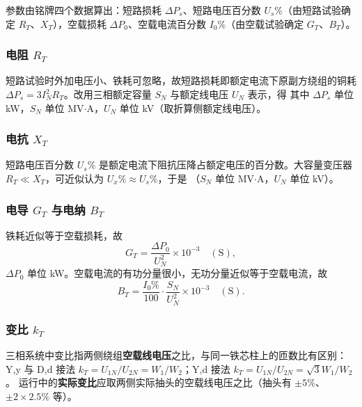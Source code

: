 参数由铭牌四个数据算出：短路损耗 $\Delta P_s$、短路电压百分数 $U_s\%$（由短路试验确定
$R_T$、$X_T$），空载损耗 $\Delta P_0$、空载电流百分数 $I_0\%$（由空载试验确定 $G_T$、$B_T$）。

\subsubsection{电阻 $R_T$}

短路试验时外加电压小、铁耗可忽略，故短路损耗即额定电流下原副方绕组的铜耗
$\Delta P_s=3I_N^2R_T$。改用三相额定容量 $S_N$ 与额定线电压 $U_N$ 表示，得
其中 $\Delta P_s$ 单位 kW，$S_N$ 单位 MV$\cdot$A，$U_N$ 单位 kV（取折算侧额定线电压）。

\subsubsection{电抗 $X_T$}

短路电压百分数 $U_s\%$ 是额定电流下阻抗压降占额定电压的百分数。大容量变压器
$R_T\ll X_T$，可近似认为 $U_x\%\approx U_s\%$，于是
（$S_N$ 单位 MV$\cdot$A，$U_N$ 单位 kV）。

\subsubsection{电导 $G_T$ 与电纳 $B_T$}

铁耗近似等于空载损耗，故
\begin{equation}
  G_T=\frac{\Delta P_0}{U_N^{2}}\times10^{-3}\quad(\text{S}),
\end{equation}
$\Delta P_0$ 单位 kW。空载电流的有功分量很小，无功分量近似等于空载电流，故
\begin{equation}
  B_T=\frac{I_0\%}{100}\cdot\frac{S_N}{U_N^{2}}\times10^{-3}\quad(\text{S}).
\end{equation}

\subsubsection{变比 $k_T$}

三相系统中变比指两侧绕组\textbf{空载线电压}之比，与同一铁芯柱上的匝数比有区别：
Y,y 与 D,d 接法 $k_T=U_{1N}/U_{2N}=W_1/W_2$；Y,d 接法 $k_T=U_{1N}/U_{2N}=\sqrt{3}W_1/W_2$。
运行中的\textbf{实际变比}应取两侧实际抽头的空载线电压之比（抽头有 $\pm5\%$、$\pm2\times2.5\%$ 等）。

